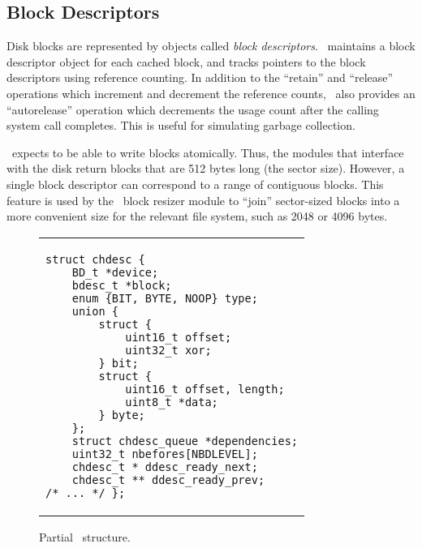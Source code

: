 
\subsection{Block Descriptors}

Disk blocks are represented by objects called \emph{block descriptors}.
\Kudos\ maintains a block descriptor object for each cached block, and tracks
pointers to the block descriptors using reference counting. In addition to the
``retain'' and ``release'' operations which increment and decrement the
reference counts, \Kudos\ also provides an ``autorelease'' operation which
decrements the usage count after the calling system call completes. This is
useful for simulating garbage collection.

\Kudos\ expects to be able to write blocks atomically. Thus, the modules that
interface with the disk return blocks that are 512 bytes long (the sector
size). However, a single block descriptor can correspond to a range of
contiguous blocks. This feature is used by the \Kudos\ block resizer module to
``join'' sector-sized blocks into a more convenient size for the relevant file
system, such as 2048 or 4096 bytes.


\begin{figure}[t]
\vskip-14pt
\begin{tabular}{@{\hskip0.58in}p{2in}@{}}
\begin{scriptsize}
\begin{verbatim}
struct chdesc {
    BD_t *device;
    bdesc_t *block;
    enum {BIT, BYTE, NOOP} type;
    union {
        struct {
            uint16_t offset;
            uint32_t xor;
        } bit;
        struct {
            uint16_t offset, length;
            uint8_t *data;
        } byte;
    };
    struct chdesc_queue *dependencies;
    uint32_t nbefores[NBDLEVEL];
    chdesc_t * ddesc_ready_next;
    chdesc_t ** ddesc_ready_prev;
/* ... */ };
\end{verbatim}
\end{scriptsize}
\end{tabular}
\vspace{-10pt}
\caption{\label{fig:chdesc} Partial \chdesc\ structure.}
\end{figure}


\subsection {\ChDescs}
\label{sec:design:chdescs}

